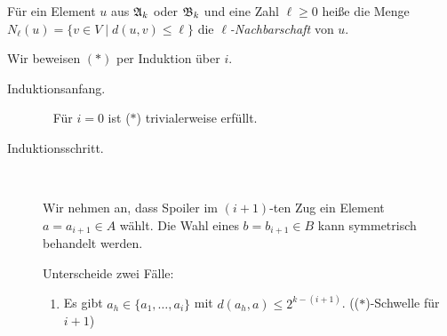 \documentclass[fontsize=11pt, twoside=false, numbers=autoenddot]{scrbook}
\begin{document}
\begin{beweis}
  F\"ur ein Element $u$ aus $\mathfrak{A}_k$ oder $\mathfrak{B}_k$ und eine Zahl $\ell \geq 0$
  heiße die Menge $N_\ell(u) = \{ v \in V \mid d(u,v) \leq \ell \}$
  die \emph{$\ell$-Nachbarschaft} von $u$.

  Wir beweisen $(*)$
  per Induktion \"uber $i$.
  \begin{description}
    \item[Induktionsanfang.]~
      F\"ur $i=0$ ist ($*$) trivialerweise erf\"ullt.
      \goodbreak
    \item[Induktionsschritt.]~
      \par
      Wir nehmen an, dass Spoiler im $(i+1)$-ten Zug ein Element $a=a_{i+1} \in A$
      w\"ahlt. Die Wahl eines $b=b_{i+1} \in B$ kann symmetrisch behandelt werden.

      \par\smallskip\noindent
      Unterscheide zwei F\"alle:
      \begin{enumerate}
        \item
          Es gibt $a_h \in \{a_1,\dots,a_i\}$ mit $d(a_h,a) \leq 2^{k-(i+1)}$. (($*$)-Schwelle f\"ur $i+1$)


\end{enumerate}
\end{description}
\end{beweis}
\end{document}
